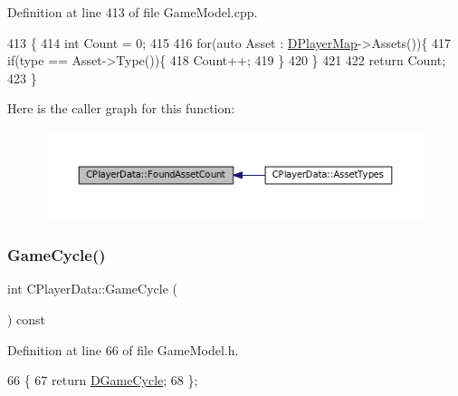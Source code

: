 Definition at line 413 of file Game\+Model.\+cpp.


\begin{DoxyCode}
413                                                \{
414     \textcolor{keywordtype}{int} Count = 0;
415     
416     \textcolor{keywordflow}{for}(\textcolor{keyword}{auto} Asset : \hyperlink{classCPlayerData_a452163191cd4603e1e38dd8d4bb9691c}{DPlayerMap}->Assets())\{
417         \textcolor{keywordflow}{if}(type == Asset->Type())\{
418             Count++;
419         \}
420     \}
421     
422     \textcolor{keywordflow}{return} Count;
423 \}
\end{DoxyCode}
Here is the caller graph for this function\+:\nopagebreak
\begin{figure}[H]
\begin{center}
\leavevmode
\includegraphics[width=350pt]{classCPlayerData_ac81c0899651bf3f9962b03ef0d7a2415_icgraph}
\end{center}
\end{figure}
\hypertarget{classCPlayerData_a91ef320747b0c6281c05a9284279e16a}{}\label{classCPlayerData_a91ef320747b0c6281c05a9284279e16a} 
\subsubsection{\texorpdfstring{Game\+Cycle()}{GameCycle()}}
{\footnotesize\ttfamily int C\+Player\+Data\+::\+Game\+Cycle (\begin{DoxyParamCaption}{ }\end{DoxyParamCaption}) const\hspace{0.3cm}{\ttfamily [inline]}}



Definition at line 66 of file Game\+Model.\+h.


\begin{DoxyCode}
66                              \{
67             \textcolor{keywordflow}{return} \hyperlink{classCPlayerData_ae92ca06a63a01681dd9f3ddc17c0e106}{DGameCycle};   
68         \};
\end{DoxyCode}
\hypertarget{classCPlayerData_ab82e14be0012e6bedfa2035e1c95ae81}{}\label{classCPlayerData_ab82e14be0012e6bedfa2035e1c95ae81} 
